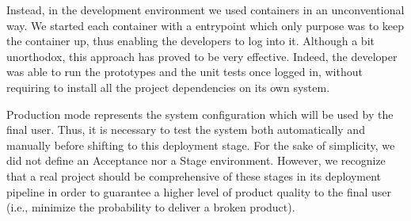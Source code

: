 Instead, in the development environment we used containers in an unconventional
way. We started each container with a entrypoint which
only purpose was to keep the container up, thus enabling the developers to log into it.
Although a bit unorthodox, this approach has proved to be very effective.
Indeed, the developer was able to run the prototypes and the unit tests once
logged in, without requiring to install all the project dependencies on its
own system.


Production mode represents the system configuration which will be used by the final user. Thus, it is necessary
to test the system both automatically and manually before shifting to this deployment stage. For the sake of
simplicity, we did not define an Acceptance nor a Stage environment. However,
we recognize that a real project should be comprehensive of these
stages in its deployment pipeline in order to guarantee a higher level of
product quality to the final user (i.e., minimize the probability to deliver a
broken product).

